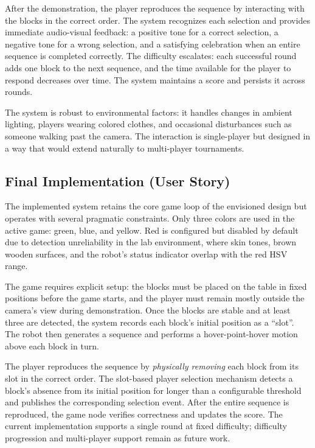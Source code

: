 \documentclass[conference]{IEEEtran}
\begin{document}
After the demonstration, the player reproduces the sequence by interacting
with the blocks in the correct order. The system recognizes each selection
and provides immediate audio-visual feedback: a positive tone for a correct
selection, a negative tone for a wrong selection, and a satisfying
celebration when an entire sequence is completed correctly. The difficulty
escalates: each successful round adds one block to the next sequence, and
the time available for the player to respond decreases over time. The
system maintains a score and persists it across rounds.

The system is robust to environmental factors: it handles changes in
ambient lighting, players wearing colored clothes, and occasional
disturbances such as someone walking past the camera. The interaction
is single-player but designed in a way that would extend naturally to
multi-player tournaments.

\subsection{Final Implementation (User Story)}

The implemented system retains the core game loop of the envisioned
design but operates with several pragmatic constraints. Only three
colors are used in the active game: green, blue, and yellow. Red is
configured but disabled by default due to detection unreliability in
the lab environment, where skin tones, brown wooden surfaces, and the
robot's status indicator overlap with the red HSV range.

The game requires explicit setup: the blocks must be placed on the
table in fixed positions before the game starts, and the player must
remain mostly outside the camera's view during demonstration. Once
the blocks are stable and at least three are detected, the system
records each block's initial position as a ``slot''. The robot then
generates a sequence and performs a hover-point-hover motion above
each block in turn.

The player reproduces the sequence by \emph{physically removing} each
block from its slot in the correct order. The slot-based player
selection mechanism detects a block's absence from its initial
position for longer than a configurable threshold and publishes the
corresponding selection event. After the entire sequence is reproduced,
the game node verifies correctness and updates the score. The current
implementation supports a single round at fixed difficulty; difficulty
progression and multi-player support remain as future work.
\end{document}
